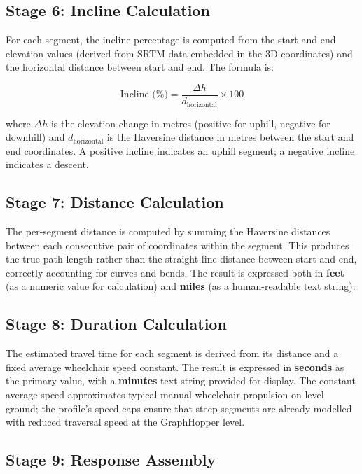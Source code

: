 \documentclass[12pt, a4paper]{report}
\begin{document}
\subsection{Stage 6: Incline Calculation}
\label{subsec:stage6}

For each segment, the incline percentage is computed from the start and end elevation values (derived from SRTM data embedded in the 3D coordinates) and the horizontal distance between start and end. The formula is:

\begin{equation}
  \text{Incline (\%)} = \frac{\Delta h}{d_{\text{horizontal}}} \times 100
\end{equation}

where $\Delta h$ is the elevation change in metres (positive for uphill, negative for downhill) and $d_{\text{horizontal}}$ is the Haversine distance in metres between the start and end coordinates. A positive incline indicates an uphill segment; a negative incline indicates a descent.

\subsection{Stage 7: Distance Calculation}
\label{subsec:stage7}

The per-segment distance is computed by summing the Haversine distances between each consecutive pair of coordinates within the segment. This produces the true path length rather than the straight-line distance between start and end, correctly accounting for curves and bends. The result is expressed both in \textbf{feet} (as a numeric value for calculation) and \textbf{miles} (as a human-readable text string).

\subsection{Stage 8: Duration Calculation}
\label{subsec:stage8}

The estimated travel time for each segment is derived from its distance and a fixed average wheelchair speed constant. The result is expressed in \textbf{seconds} as the primary value, with a \textbf{minutes} text string provided for display. The constant average speed approximates typical manual wheelchair propulsion on level ground; the profile's speed caps ensure that steep segments are already modelled with reduced traversal speed at the GraphHopper level.

\subsection{Stage 9: Response Assembly}
\label{subsec:stage9}
\end{document}

